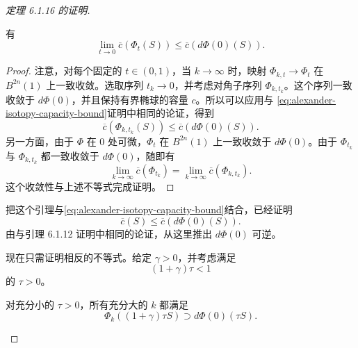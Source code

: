 \begin{proof}[定理 6.1.16 的证明]
\begin{lemma}\label{lem:capacity-alexander-limit}
有
\[
 \lim_{t\to0}\overline c(\Phi_t(S))
 \leq\overline c(d\Phi(0)(S)).
\]
\end{lemma}

\begin{proof}
注意，对每个固定的 $t\in(0,1)$，当 $k\to\infty$ 时，映射
$\Phi_{k,t}\to\Phi_t$ 在 $B^{2n}(1)$ 上一致收敛。选取序列
$t_k\to0$，并考虑对角子序列 $\Phi_{k,t_k}$。这个序列一致收敛于
$d\Phi(0)$，并且保持有界椭球的容量 $c$。所以可以应用与
\eqref{eq:alexander-isotopy-capacity-bound}证明中相同的论证，得到
\[
 \overline c(\Phi_{k,t_k}(S))
 \leq\overline c(d\Phi(0)(S)).
\]
另一方面，由于 $\Phi$ 在 $0$ 处可微，$\Phi_t$ 在 $B^{2n}(1)$ 上一致收敛于 $d\Phi(0)$。由于 $\Phi_{t_k}$ 与 $\Phi_{k,t_k}$ 都一致收敛于
$d\Phi(0)$，随即有
\[
 \lim_{k\to\infty}\overline c(\Phi_{t_k})
 =\lim_{k\to\infty}\overline c(\Phi_{k,t_k}).
\]
这个收敛性与上述不等式完成证明。
\end{proof}

把这个引理与\eqref{eq:alexander-isotopy-capacity-bound}结合，已经证明
\begin{equation}
 \overline c(S)\leq\overline c(d\Phi(0)(S)).
 \label{eq:derivative-capacity-lower-bound}
\end{equation}
由与引理 6.1.12 证明中相同的论证，从这里推出 $d\Phi(0)$ 可逆。

现在只需证明相反的不等式。给定 $\gamma>0$，并考虑满足
\[
 (1+\gamma)\tau<1
\]
的 $\tau>0$。

\begin{lemma}\label{lem:uniform-map-covers-derivative-image}
对充分小的 $\tau>0$，所有充分大的 $k$ 都满足
\[
 \Phi_k((1+\gamma)\tau S)\supset d\Phi(0)(\tau S).
\]
\end{lemma}


\end{proof}
